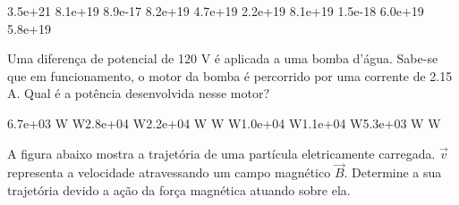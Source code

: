 \documentclass[12pt, addpoints]{exam}
\begin{document}
\begin{questions}
\begin{multicols*}{2}
\begin{oneparchoices}
\choice 3.5e+21 \choice 8.1e+19 \choice 8.9e-17 \choice 8.2e+19 \choice 4.7e+19 \choice 2.2e+19 \choice 8.1e+19 \choice 1.5e-18 \choice 6.0e+19 \choice 5.8e+19 
\end{oneparchoices}\question Uma diferença de potencial de 120 V é aplicada a uma bomba d’água. Sabe-se que em funcionamento, o motor da bomba é percorrido por uma corrente de    2.15 A. Qual é a potência desenvolvida nesse motor?

\begin{oneparchoices}
\choice 6.7e+03 W W\choice 2.8e+04 W\choice 2.2e+04 W W W\choice 1.0e+04 W\choice 1.1e+04 W\choice 5.3e+03 W W
\end{oneparchoices}\question A ﬁgura abaixo mostra a trajetória de uma partícula eletricamente carregada. $\vec{{v}}$ representa a velocidade atravessando um campo magnético $\vec{{B}}$. Determine a sua trajetória devido a ação da força magnética atuando sobre ela.
        
        \begin{center}
            \begin{minipage}[c]{0.5\linewidth}
            \end{minipage}
        \end{center}

        


\end{multicols*}
\end{questions}
\end{document}
